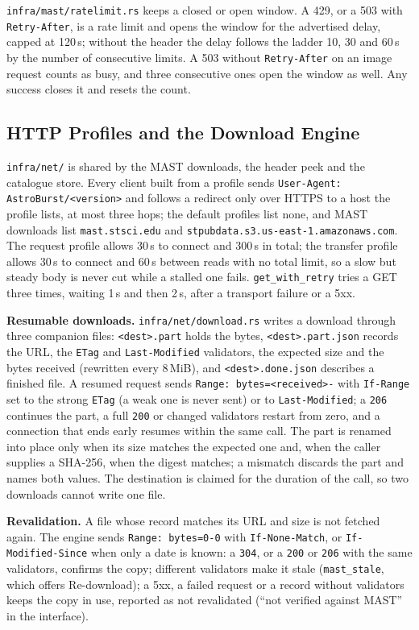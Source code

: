 \documentclass[11pt,a4paper]{article}
\newcommand{\code}[1]{\texttt{\small #1}}
\begin{document}
    \code{infra/mast/ratelimit.rs} keeps a closed or open window. A 429, or a 503 with \code{Retry-After}, is a rate limit and opens the window for the advertised delay, capped at 120\,s; without the header the delay follows the ladder 10, 30 and 60\,s by the number of consecutive limits. A 503 without \code{Retry-After} on an image request counts as busy, and three consecutive ones open the window as well. Any success closes it and resets the count.

    \subsection{HTTP Profiles and the Download Engine}
    \label{sec:net}

    \code{infra/net/} is shared by the MAST downloads, the header peek and the catalogue store. Every client built from a profile sends \code{User-Agent: AstroBurst/<version>} and follows a redirect only over HTTPS to a host the profile lists, at most three hops; the default profiles list none, and MAST downloads list \code{mast.stsci.edu} and \code{stpubdata.s3.us-east-1.amazonaws.com}. The request profile allows 30\,s to connect and 300\,s in total; the transfer profile allows 30\,s to connect and 60\,s between reads with no total limit, so a slow but steady body is never cut while a stalled one fails. \code{get\_with\_retry} tries a GET three times, waiting 1\,s and then 2\,s, after a transport failure or a 5xx.

    \textbf{Resumable downloads.} \code{infra/net/download.rs} writes a download through three companion files: \code{<dest>.part} holds the bytes, \code{<dest>.part.json} records the URL, the \code{ETag} and \code{Last-Modified} validators, the expected size and the bytes received (rewritten every 8\,MiB), and \code{<dest>.done.json} describes a finished file. A resumed request sends \code{Range: bytes=<received>-} with \code{If-Range} set to the strong \code{ETag} (a weak one is never sent) or to \code{Last-Modified}; a \code{206} continues the part, a full \code{200} or changed validators restart from zero, and a connection that ends early resumes within the same call. The part is renamed into place only when its size matches the expected one and, when the caller supplies a SHA-256, when the digest matches; a mismatch discards the part and names both values. The destination is claimed for the duration of the call, so two downloads cannot write one file.

    \textbf{Revalidation.} A file whose record matches its URL and size is not fetched again. The engine sends \code{Range: bytes=0-0} with \code{If-None-Match}, or \code{If-Modified-Since} when only a date is known: a \code{304}, or a \code{200} or \code{206} with the same validators, confirms the copy; different validators make it stale (\code{mast\_stale}, which offers Re-download); a 5xx, a failed request or a record without validators keeps the copy in use, reported as not revalidated (``not verified against MAST'' in the interface).
\end{document}
